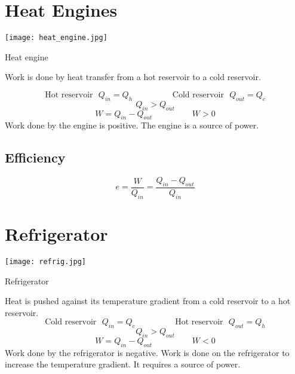 
\newpage

\section{Heat Engines}
\begin{marginfigure}[0pt]
  \texttt{[image: heat\_engine.jpg]}
  \caption{Heat engine}
  \label{fig:marginfig}
\end{marginfigure}

Work is done by heat transfer from a hot reservoir to a cold reservoir.

$$\text{Hot reservoir}\ \ \ Q_{in}=Q_h \hspace{2cm} \text{Cold reservoir}\ \ \ Q_{out}=Q_c$$ 
$$Q_{in}>Q_{out}$$
$$W=Q_{in}-Q_{out} \hspace{2cm} W>0$$
Work done by the engine is positive.  The engine is a source of power.
\subsection{Efficiency}
$$e=\frac{W}{Q_{in}}=\frac{Q_{in}-Q_{out}}{Q_{in}}$$
\section{Refrigerator}
\begin{marginfigure}[50pt]
  \texttt{[image: refrig.jpg]}
  \caption{Refrigerator}
  \label{fig:marginfig}
\end{marginfigure}
Heat is pushed against its temperature gradient from a cold reservoir to a hot reservoir.  
$$\text{Cold reservoir}\ \ \ Q_{in}=Q_c \hspace{2cm} \text{Hot reservoir}\ \ \ Q_{out}=Q_h$$ 
$$Q_{in}>Q_{out}$$
$$W=Q_{in}-Q_{out} \hspace{2cm} W<0$$
Work done by the refrigerator is negative.  Work is done on the refrigerator to increase the temperature gradient.  It requires a source of power.

